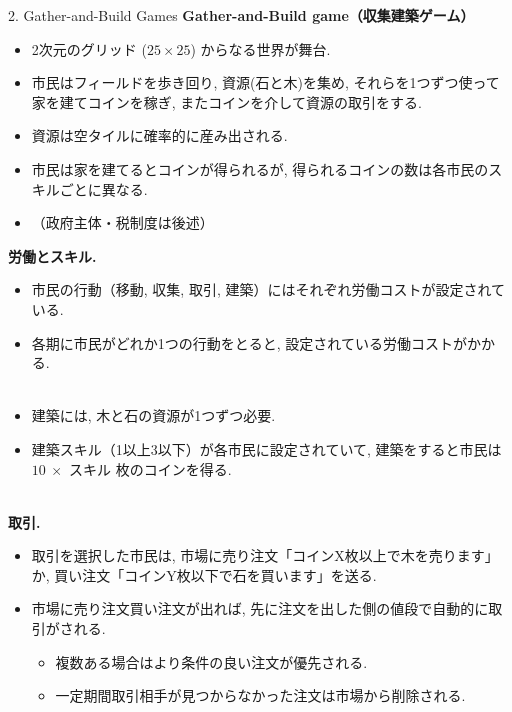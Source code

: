 \documentclass[unicode,aspectratio=169,11pt]{beamer}
\begin{document}

\begin{frame}{2. Gather-and-Build Games}{}
{\bf Gather-and-Build game（収集建築ゲーム）}
\begin{itemize}
    \item 2次元のグリッド ($25 \times 25$) からなる世界が舞台.
    \item 市民はフィールドを歩き回り, 資源(石と木)を集め, それらを1つずつ使って家を建てコインを稼ぎ, またコインを介して資源の取引をする.
    \item 資源は空タイルに確率的に産み出される.
    \item 市民は家を建てるとコインが得られるが, 得られるコインの数は各市民のスキルごとに異なる.
    \item （政府主体・税制度は後述）
\end{itemize}
\end{frame}

\begin{frame}{}{}
{\bf 労働とスキル.}
\begin{itemize}
    \item 市民の行動（移動, 収集, 取引, 建築）にはそれぞれ労働コストが設定されている.
    \item 各期に市民がどれか1つの行動をとると, 設定されている労働コストがかかる.\\
    　
    \item 建築には, 木と石の資源が1つずつ必要.
    \item 建築スキル（1以上3以下）が各市民に設定されていて, 建築をすると市民は $10\ \times$ スキル 枚のコインを得る.\\
    　
\end{itemize}
{\bf 取引.}
\begin{itemize}
    \item 取引を選択した市民は, 市場に売り注文「コインX枚以上で木を売ります」か, 買い注文「コインY枚以下で石を買います」を送る.
    \item 市場に売り注文買い注文が出れば, 先に注文を出した側の値段で自動的に取引がされる.
        \begin{itemize}
            \item 複数ある場合はより条件の良い注文が優先される.
            \item 一定期間取引相手が見つからなかった注文は市場から削除される.
        \end{itemize}
\end{itemize}
\end{frame}
\end{document}
